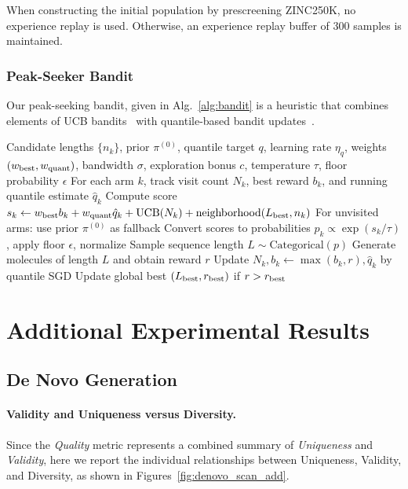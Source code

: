 \documentclass{article} %
\begin{document}
When constructing the initial population by prescreening ZINC250K, no experience replay is used.
Otherwise, an experience replay buffer of 300 samples is maintained.

\subsubsection{Peak-Seeker Bandit}\label{app:bandit}
Our peak-seeking bandit, given in Alg.~\ref{alg:bandit} is a heuristic that combines elements of UCB bandits~\citep{ucb} with quantile-based bandit updates~\citep{quantile}.
\begin{algorithm}[H]
\caption{Peak-Seeker Bandit for Adaptive Length Sampling}\label{alg:bandit}
\begin{algorithmic}[1]
\Require Candidate lengths $\{n_k\}$, prior $\pi^{(0)}$, quantile target $q$, learning rate $\eta_q$, weights $(w_{\rm best}, w_{\rm quant})$, bandwidth $\sigma$, exploration bonus $c$, temperature $\tau$, floor probability $\epsilon$
    \State For each arm $k$, track visit count $N_k$, best reward $b_k$, and running quantile estimate $\hat q_k$
    \State Compute score $s_k \gets w_{\rm best} b_k + w_{\rm quant} \hat q_k + \text{UCB}(N_k) + \text{neighborhood}(L_{\rm best}, n_k)$
    \State For unvisited arms: use prior $\pi^{(0)}$ as fallback
    \State Convert scores to probabilities $p_k \propto \exp(s_k/\tau)$, apply floor $\epsilon$, normalize
    \State Sample sequence length $L \sim \text{Categorical}(p)$
    \State Generate molecules of length $L$ and obtain reward $r$
    \State Update $N_k, b_k \gets \max(b_k, r), \hat q_k$ by quantile SGD
    \State Update global best $(L_{\rm best}, r_{\rm best})$ if $r>r_{\rm best}$
\EndWhile
\end{algorithmic}
\end{algorithm}
\clearpage
\section{Additional Experimental Results}
\subsection{De Novo Generation}\label{app:denov}

\paragraph{Validity and Uniqueness versus Diversity.}
Since the \textit{Quality} metric represents a combined summary of \textit{Uniqueness} and \textit{Validity}, here we report the individual relationships between Uniqueness, Validity, and Diversity, as shown in Figures~\ref{fig:denovo_scan_add}.
\end{document}
